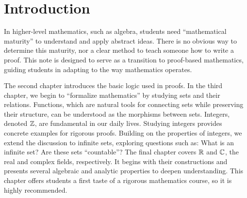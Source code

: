 \documentclass[10pt]{article}
\begin{document}
\def\htitle{An Introduction to Proofs}
\def\hauthor{Hassium}
\hsetup
\htoc
\hmain
\par
\section{Introduction}
In higher-level mathematics, such as algebra, students need ``mathematical maturity'' to understand and apply abstract ideas. There is no obvious way to determine this maturity, nor a clear method to teach someone how to write a proof. This note is designed to serve as a transition to proof-based mathematics, guiding students in adapting to the way mathematics operates.
\par
The second chapter introduces the basic logic used in proofs. In the third chapter, we begin to “formalize mathematics” by studying sets and their relations. Functions, which are natural tools for connecting sets while preserving their structure, can be understood as the morphisms between sets. Integers, denoted $\mathbb{Z}$, are fundamental in our daily lives. Studying integers provides concrete examples for rigorous proofs. Building on the properties of integers, we extend the discussion to infinite sets, exploring questions such as: What is an infinite set? Are these sets “countable”? The final chapter covers $\mathbb{R}$ and $\mathbb{C}$, the real and complex fields, respectively. It begins with their constructions and presents several algebraic and analytic properties to deepen understanding. This chapter offers students a first taste of a rigorous mathematics course, so it is highly recommended.
\end{document}
